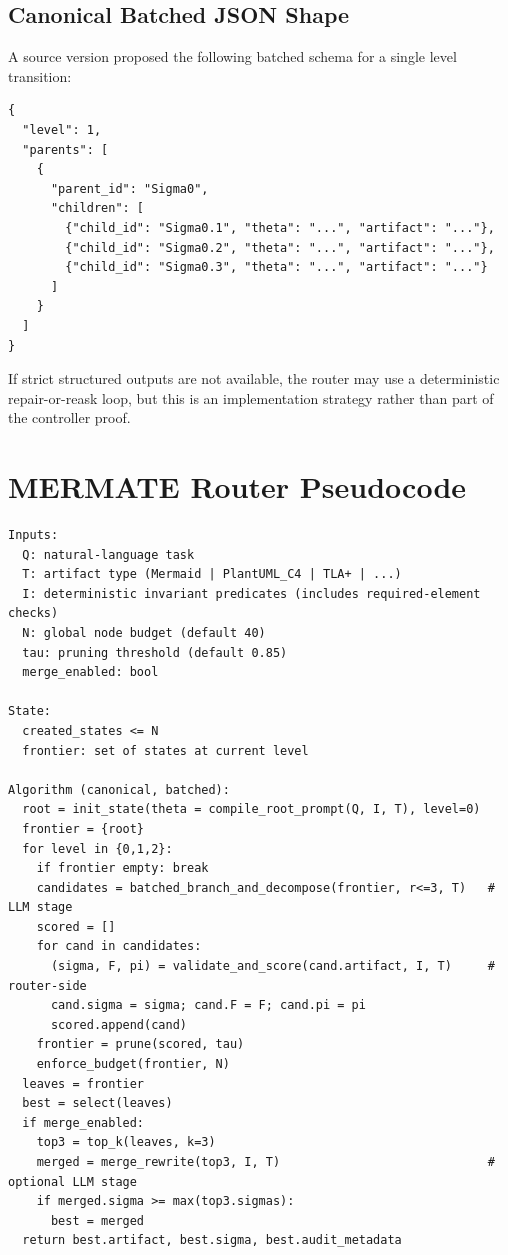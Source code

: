 \documentclass[11pt,a4paper]{article}
\numberwithin{equation}{section}
\theoremstyle{definition}
\begin{document}
\subsection{Canonical Batched JSON Shape}

A source version proposed the following batched schema for a single level transition:

\begin{verbatim}
{
  "level": 1,
  "parents": [
    {
      "parent_id": "Sigma0",
      "children": [
        {"child_id": "Sigma0.1", "theta": "...", "artifact": "..."},
        {"child_id": "Sigma0.2", "theta": "...", "artifact": "..."},
        {"child_id": "Sigma0.3", "theta": "...", "artifact": "..."}
      ]
    }
  ]
}
\end{verbatim}

If strict structured outputs are not available, the router may use a deterministic repair-or-reask loop, but this is an implementation strategy rather than part of the controller proof.

\section{MERMATE Router Pseudocode}

\begin{verbatim}
Inputs:
  Q: natural-language task
  T: artifact type (Mermaid | PlantUML_C4 | TLA+ | ...)
  I: deterministic invariant predicates (includes required-element checks)
  N: global node budget (default 40)
  tau: pruning threshold (default 0.85)
  merge_enabled: bool

State:
  created_states <= N
  frontier: set of states at current level

Algorithm (canonical, batched):
  root = init_state(theta = compile_root_prompt(Q, I, T), level=0)
  frontier = {root}
  for level in {0,1,2}:
    if frontier empty: break
    candidates = batched_branch_and_decompose(frontier, r<=3, T)   # LLM stage
    scored = []
    for cand in candidates:
      (sigma, F, pi) = validate_and_score(cand.artifact, I, T)     # router-side
      cand.sigma = sigma; cand.F = F; cand.pi = pi
      scored.append(cand)
    frontier = prune(scored, tau)
    enforce_budget(frontier, N)
  leaves = frontier
  best = select(leaves)
  if merge_enabled:
    top3 = top_k(leaves, k=3)
    merged = merge_rewrite(top3, I, T)                             # optional LLM stage
    if merged.sigma >= max(top3.sigmas):
      best = merged
  return best.artifact, best.sigma, best.audit_metadata
\end{verbatim}
\end{document}
